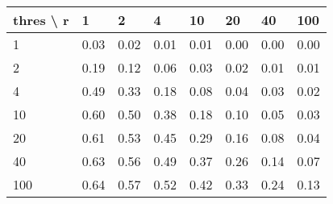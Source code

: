 \begin{tabular}[]{llllllll}
\toprule
thres \textbackslash{} r & 1 & 2 & 4 & 10 & 20 & 40 & 100 \\
\midrule{}
1   & 0.03 & 0.02 & 0.01 & 0.01 & 0.00 & 0.00 & 0.00 \\
2   & 0.19 & 0.12 & 0.06 & 0.03 & 0.02 & 0.01 & 0.01 \\
4   & 0.49 & 0.33 & 0.18 & 0.08 & 0.04 & 0.03 & 0.02 \\
10  & 0.60 & 0.50 & 0.38 & 0.18 & 0.10 & 0.05 & 0.03 \\
20  & 0.61 & 0.53 & 0.45 & 0.29 & 0.16 & 0.08 & 0.04 \\
40  & 0.63 & 0.56 & 0.49 & 0.37 & 0.26 & 0.14 & 0.07 \\
100 & 0.64 & 0.57 & 0.52 & 0.42 & 0.33 & 0.24 & 0.13 \\
\bottomrule
\end{tabular}
